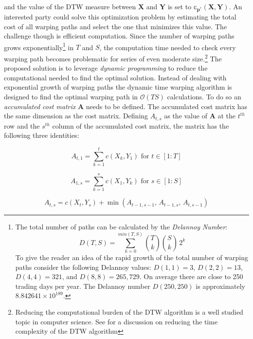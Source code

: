 and the value of the DTW measure between $\boldsymbol{X}$ and $\boldsymbol{Y}$ is set to $\mathbb{c}_{\boldsymbol{p^{*}}}(\boldsymbol{X}, \boldsymbol{Y})$. An interested party could solve this optimization problem by estimating the total cost of all warping paths and select the one that minimizes this value. The challenge though is efficient computation.
Since the number of warping paths grows exponentially\footnote{The total number of paths can be calculated by the \textit{Delannoy Number}: \begin{equation} D(T, S) = \sum^{min(T, S)}_{k=0} {T\choose k} {S\choose k}\, 2^{k} \end{equation} To give the reader an idea of the rapid growth of the total number of warping paths consider the following Delannoy values: $D(1,1)=3$, $D(2,2) = 13$, $D(4,4) = 321$, and $D(8, 8) = 265,729$. On average there are close to 250 trading days per year. The Delannoy number $D(250, 250)$ is approximately $8.842641\times10^{189}$.} in $T$ and $S$, the computation time needed to check every warping path becomes problematic for series of even moderate size.\footnote{Reducing the computational burden of the DTW algorithm is a well studied topic in computer science. See \cite{KeoghRatanamahatana_2005} for a discussion on reducing the time complexity of the DTW algorithm} The proposed solution is to leverage \emph{dynamic programming} to reduce the computational needed to find the optimal solution. Instead of dealing with exponential growth of warping paths the dynamic time warping algorithm is designed to find the optimal warping path in $\mathcal{O}(TS)$ calculations. To do so an \emph{accumulated cost matrix} $\boldsymbol{A}$ needs to be defined. The accumulated cost matrix has the same dimension as the cost matrix. Defining $A_{t,s}$ as the value of $\boldsymbol{A}$ at the $t^{th}$ row and the $s^{th}$ column of the accumulated cost matrix, the matrix has the following three identities:

\begin{equation} \label{eq:dtw_accum_cost_x_axis}
    A_{t,1} = \sum^{t}_{k=1} c(X_{k}, Y_{1}) \,\, \textrm{for} \,\, t \in [1:T]
\end{equation}

\begin{equation} \label{eq:dtw_accum_cost_y_axis}
    A_{1,s} = \sum^{s}_{k=1} c(X_{1}, Y_{k}) \,\, \textrm{for} \,\, s \in [1:S]
\end{equation}

\begin{equation} \label{eq:dtw_recursive_calculation}
    A_{t, s} = c(X_{t}, Y_{s}) + \min\left(A_{t-1, s-1}, \, A_{t-1, s}, \, A_{t, s-1}\right)
\end{equation}

